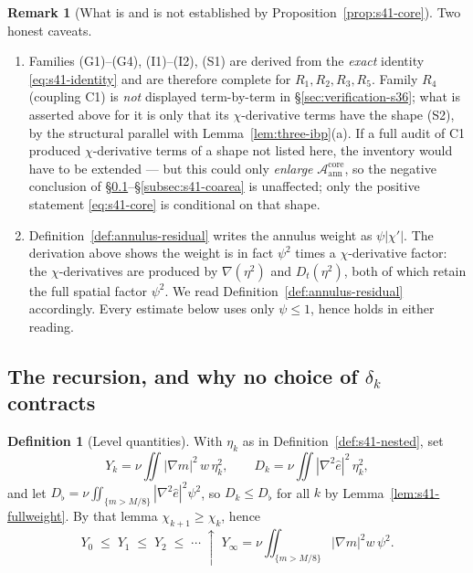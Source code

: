 \documentclass[11pt]{article}
\theoremstyle{definition}
\newtheorem{definition}[theorem]{Definition}
\newtheorem{remark}[theorem]{Remark}
\theoremstyle{remark}
\begin{document}
\begin{remark}[What is and is not established by
  Proposition~\ref{prop:s41-core}]\label{rem:s41-caveat}
  Two honest caveats.
  \begin{enumerate}[label=(\roman*)]
    \item Families (G1)--(G4), (I1)--(I2), (S1) are derived from the
      \emph{exact} identity \eqref{eq:s41-identity} and are therefore
      complete for $R_1,R_2,R_3,R_5$. Family $R_4$ (coupling C1) is
      \emph{not} displayed term-by-term in \S\ref{sec:verification-s36};
      what is asserted above for it is only that its
      $\chi$-derivative terms have the shape (S2), by the structural
      parallel with Lemma~\ref{lem:three-ibp}(a). If a full audit of C1
      produced $\chi$-derivative terms of a shape not listed here, the
      inventory would have to be extended --- but this could only
      \emph{enlarge} $\mathcal{A}^{\mathrm{core}}_{\mathrm{ann}}$, so the
      negative conclusion of \S\ref{subsec:s41-recursion}--\S\ref{subsec:s41-coarea}
      is unaffected; only the positive statement
      \eqref{eq:s41-core} is conditional on that shape.
    \item Definition~\ref{def:annulus-residual} writes the annulus weight as
      $\psi|\chi'|$. The derivation above shows the weight is in fact
      $\psi^2$ times a $\chi$-derivative factor: the $\chi$-derivatives are
      produced by $\nabla(\eta^2)$ and $D_t(\eta^2)$, both of which retain
      the full spatial factor $\psi^2$. We read
      Definition~\ref{def:annulus-residual} accordingly. Every estimate
      below uses only $\psi\leq1$, hence holds in either reading.
  \end{enumerate}
\end{remark}

\subsection{The recursion, and why no choice of $\delta_k$ contracts}
\label{subsec:s41-recursion}

\begin{definition}[Level quantities]\label{def:s41-levelquantities}
  With $\eta_k$ as in Definition~\ref{def:s41-nested}, set
  \[
    Y_k=\nu\iint|\nabla m|^2\,w\,\eta_k^2,\qquad
    D_k=\nu\iint|\nabla^2\hat{e}|^2\,\eta_k^2,
  \]
  and let $D_\flat=\nu\iint_{\{m>M/8\}}|\nabla^2\hat{e}|^2\psi^2$, so
  $D_k\leq D_\flat$ for all $k$ by Lemma~\ref{lem:s41-fullweight}. By that
  lemma $\chi_{k+1}\geq\chi_k$, hence
  \begin{equation}\label{eq:s41-monotone}
    Y_0\;\leq\;Y_1\;\leq\;Y_2\;\leq\;\cdots\;\uparrow\;
    Y_\infty=\nu\iint_{\{m>M/8\}}|\nabla m|^2w\,\psi^2 .
  \end{equation}
\end{definition}
\end{document}
